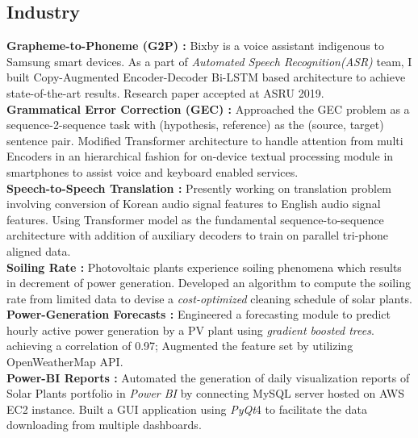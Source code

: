 \documentclass[11pt,a4paper,sans]{moderncv}        %
\begin{document}
\subsection{Industry}
{\textbf{Grapheme-to-Phoneme (G2P) :} Bixby is a voice assistant indigenous to Samsung smart devices. As a part of \textit{Automated Speech Recognition(ASR)} team, I built Copy-Augmented Encoder-Decoder Bi-LSTM based architecture to achieve state-of-the-art results. Research paper accepted at ASRU 2019.
\vspace{4} \\ 
\textbf{Grammatical Error Correction (GEC) :} Approached the GEC problem as a sequence-2-sequence task with (hypothesis, reference) as the (source, target) sentence pair. Modified Transformer architecture to handle attention from multi Encoders in an hierarchical fashion for on-device textual processing module in smartphones to assist voice and keyboard enabled services.
\vspace{4} \\ 
\textbf{Speech-to-Speech Translation :} Presently working on translation problem involving conversion of Korean audio signal features to English audio signal features. Using Transformer model as the fundamental sequence-to-sequence architecture with addition of auxiliary decoders to train on parallel tri-phone aligned data.\\}
\vspace{-2mm}
{\textbf{Soiling Rate :} Photovoltaic plants experience soiling phenomena which results in decrement of power generation. Developed an algorithm to compute the soiling rate from limited data to devise a \textit{cost-optimized} cleaning schedule of solar plants.
\vspace{4} \\ 
\textbf{Power-Generation Forecasts : }Engineered a forecasting module to predict hourly active power generation by a PV plant using \textit{gradient boosted trees}. achieving a correlation of 0.97; Augmented the feature set by utilizing OpenWeatherMap API.
\vspace{4} \\ 
\textbf{Power-BI Reports : }Automated the generation of daily visualization reports of Solar Plants portfolio in \textit{Power BI} by connecting MySQL server hosted on AWS EC2 instance. Built a GUI application using \textit{PyQt}4 to facilitate the data downloading from multiple dashboards. \\
}
\end{document}
